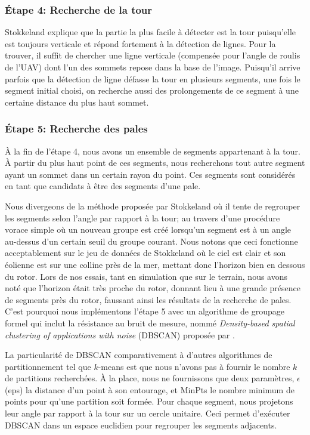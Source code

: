 \subsubsection{Étape 4: Recherche de la tour}
\label{subsubsec:approach4}

Stokkeland explique que la partie la plus facile à détecter est la tour puisqu'elle est toujours verticale et répond fortement à la détection de lignes. Pour la trouver, il suffit de chercher une ligne verticale (compensée pour l'angle de roulis de l'UAV) dont l'un des sommets repose dans la base de l'image. Puisqu'il arrive parfois que la détection de ligne défasse la tour en plusieurs segments, une fois le segment initial choisi, on recherche aussi des prolongements de ce segment à une certaine distance du plus haut sommet.

\subsubsection{Étape 5: Recherche des pales}

À la fin de l'étape 4, nous avons un ensemble de segments appartenant à la tour. À partir du plus haut point de ces segments, nous recherchons tout autre segment ayant un sommet dans un certain rayon du point. Ces segments sont considérés en tant que candidats à être des segments d'une pale.

Nous divergeons de la méthode proposée par Stokkeland où il tente de regrouper les segments selon l'angle par rapport à la tour; au travers d'une procédure vorace simple où un nouveau groupe est créé lorsqu'un segment est à un angle au-dessus d'un certain seuil du groupe courant. Nous notons que ceci fonctionne acceptablement sur le jeu de données de Stokkeland où le ciel est clair et son éolienne est sur une colline près de la mer, mettant donc l'horizon bien en dessous du rotor. Lors de nos essais, tant en simulation que sur le terrain, nous avons noté que l'horizon était très proche du rotor, donnant lieu à une grande présence de segments près du rotor, faussant ainsi les résultats de la recherche de pales. C'est pourquoi nous implémentons l'étape 5 avec un algorithme de groupage formel qui inclut la résistance au bruit de mesure, nommé \textit{Density-based spatial clustering of applications with noise} (DBSCAN) proposée par \citep{Ester1996}.

La particularité de DBSCAN comparativement à d'autres algorithmes de partitionnement tel que $k$-means est que nous n'avons pas à fournir le nombre $k$ de partitions recherchées. À la place, nous ne fournissons que deux paramètres, $\epsilon$ (eps) la distance d'un point à son entourage, et MinPts le nombre minimum de points pour qu'une partition soit formée. Pour chaque segment, nous projetons leur angle par rapport à la tour sur un cercle unitaire. Ceci permet d'exécuter DBSCAN dans un espace euclidien pour regrouper les segments adjacents.

